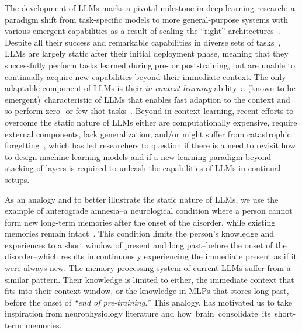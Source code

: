The development of LLMs marks a pivotal milestone in deep learning research: a paradigm shift from task-specific models to more general-purpose systems with various emergent capabilities as a result of scaling the ``right'' architectures~\citep{brown2020language, schaeffer2023emergent}. Despite all their success and remarkable capabilities in diverse sets of tasks~\citep{comanici2025gemini, nijkamp2023codegen, wang2023visionllm}, LLMs are largely static after their initial deployment phase, meaning that they successfully perform tasks learned during pre- or post-training, but are unable to continually acquire new capabilities beyond their immediate context. The only adaptable component of LLMs is their \emph{in-context learning} ability–a (known to be emergent)~characteristic of LLMs that enables fast adaption to the context and so perform zero- or few-shot tasks~\citep{brown2020language}. Beyond in-context learning, recent efforts to overcome the static nature of LLMs either are computationally expensive, require external components, lack generalization, and/or might suffer from catastrophic forgetting~\citep{eyuboglu2025cartridges, yu2025finemedlmo, akyureksurprising}, which has led researchers to question if there is a need to revisit how to design machine learning models and if a new learning paradigm beyond stacking of layers is required to unleash the capabilities of LLMs in continual setups. 





As an analogy and to better illustrate the static nature of LLMs, we use the example of anterograde amnesia–a neurological condition where a person cannot form new long-term memories after the onset of the disorder, while existing memories remain intact~\citep{scoville1957loss}. This condition limits the person's knowledge and experiences to a short window of present and long past–before the onset of the disorder–which results in continuously experiencing the immediate present as if it were always new. The memory processing system of current LLMs suffer from a similar pattern. Their knowledge is limited to either, the immediate context that fits into their context window, or the knowledge in MLPs that stores long-past, before the onset of \emph{``end of pre-training.''} This analogy, has motivated us to take inspiration from neurophysiology literature and how~brain~consolidate~its~short-term~memories.






